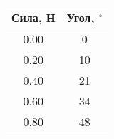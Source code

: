 \begin{tabular}{|c|c|}
\hline
Сила, Н & Угол, $^\circ$ \\ \hline
0.00 & 0 \\ \hline
0.20 & 10 \\ \hline
0.40 & 21 \\ \hline
0.60 & 34 \\ \hline
0.80 & 48 \\ \hline
\end{tabular}
